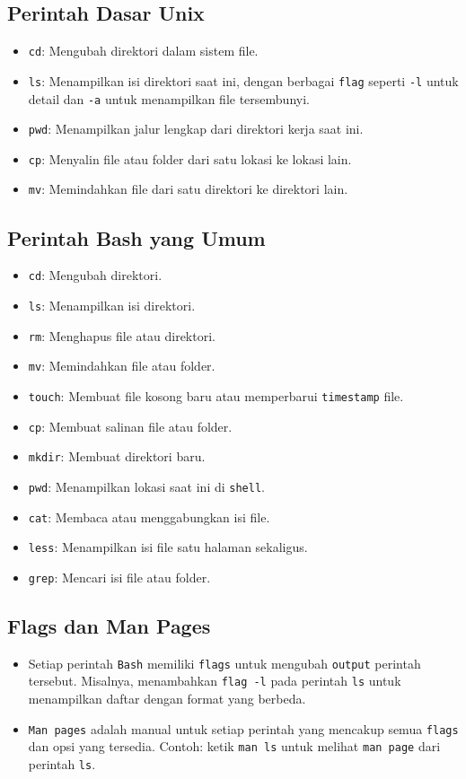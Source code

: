 \documentclass{article}
\begin{document}
\subsection{Perintah Dasar Unix}
\begin{itemize}
    \item \texttt{cd}: Mengubah direktori dalam sistem file.
    \item \texttt{ls}: Menampilkan isi direktori saat ini, dengan berbagai \texttt{flag} seperti \texttt{-l} untuk detail dan \texttt{-a} untuk menampilkan file tersembunyi.
    \item \texttt{pwd}: Menampilkan jalur lengkap dari direktori kerja saat ini.
    \item \texttt{cp}: Menyalin file atau folder dari satu lokasi ke lokasi lain.
    \item \texttt{mv}: Memindahkan file dari satu direktori ke direktori lain.
\end{itemize}

\subsection{Perintah Bash yang Umum}
\begin{itemize}
    \item \texttt{cd}: Mengubah direktori.
    \item \texttt{ls}: Menampilkan isi direktori.
    \item \texttt{rm}: Menghapus file atau direktori.
    \item \texttt{mv}: Memindahkan file atau folder.
    \item \texttt{touch}: Membuat file kosong baru atau memperbarui \texttt{timestamp} file.
    \item \texttt{cp}: Membuat salinan file atau folder.
    \item \texttt{mkdir}: Membuat direktori baru.
    \item \texttt{pwd}: Menampilkan lokasi saat ini di \texttt{shell}.
    \item \texttt{cat}: Membaca atau menggabungkan isi file.
    \item \texttt{less}: Menampilkan isi file satu halaman sekaligus.
    \item \texttt{grep}: Mencari isi file atau folder.
\end{itemize}

\subsection{Flags dan Man Pages}
\begin{itemize}
    \item Setiap perintah \texttt{Bash} memiliki \texttt{flags} untuk mengubah \texttt{output} perintah tersebut. Misalnya, menambahkan \texttt{flag -l} pada perintah \texttt{ls} untuk menampilkan daftar dengan format yang berbeda.
    \item \texttt{Man pages} adalah manual untuk setiap perintah yang mencakup semua \texttt{flags} dan opsi yang tersedia. Contoh: ketik \texttt{man ls} untuk melihat \texttt{man page} dari perintah \texttt{ls}.
\end{itemize}
\end{document}
